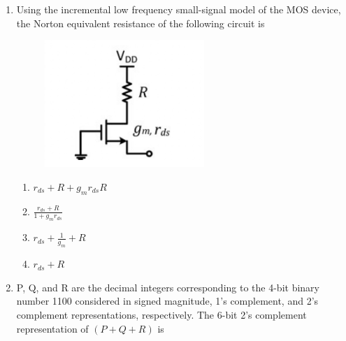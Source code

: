 \documentclass[a4paper, 11pt]{article}
\begin{document}
\begin{enumerate}
    \hfill{}

    \item Using the incremental low frequency small-signal model of the MOS device, the Norton equivalent resistance of the following circuit is
    \begin{figure}[H]
        \centering
        \includegraphics[width=0.4\columnwidth]{figs/Q37.png}
        \caption*{}
        \label{fig:q47}
    \end{figure}
    \begin{enumerate}
        \item $r_{ds} + R + g_m r_{ds} R$
        \item $\frac{r_{ds} + R}{1 + g_m r_{ds}}$
        \item $r_{ds} + \frac{1}{g_m} + R$
        \item $r_{ds} + R$
    \end{enumerate}

    \hfill{}

    \item P, Q, and R are the decimal integers corresponding to the 4-bit binary number 1100 considered in signed magnitude, 1's complement, and 2's complement representations, respectively. The 6-bit 2's complement representation of $(P+Q+R)$ is
    \begin{enumerate}
    \end{enumerate}

    \hfill{}


\end{enumerate}
\end{document}
